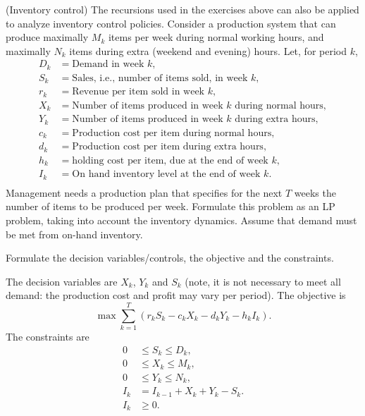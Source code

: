 \begin{exercise}(Inventory control) The recursions used in the
  exercises above can also be applied to analyze inventory control
  policies. Consider a production system that can produce maximally
  $M_k$ items per week during normal working hours, and maximally
  $N_k$ items during extra (weekend and evening) hours. Let, for
  period $k$,
  \begin{align*}
    D_k &= \text{Demand in  week $k$}, \\
    S_k &= \text{Sales, i.e., number of items sold, in week $k$}, \\
    r_k &= \text{Revenue per item sold in week $k$}, \\
    X_k &= \text{Number of items produced in week $k$  during normal hours}, \\
    Y_k &= \text{Number of items produced in week $k$ during extra  hours}, \\
    c_k &= \text{Production cost per item during normal  hours}, \\
    d_k &= \text{Production cost per item during extra  hours}, \\
    h_k &= \text{holding cost per  item, due at the end of week $k$}, \\
    I_k &= \text{On hand inventory level at the end of week $k$}. \\
  \end{align*}
  Management needs a production plan that specifies for the next $T$
  weeks the number of items to be produced per week. Formulate this
  problem as an LP problem, taking into account the inventory
  dynamics.  Assume that demand must be met from on-hand inventory.
  \begin{hint}
Formulate the decision variables/controls, the
    objective and the constraints.    
  \end{hint}
  \begin{solution}
    The decision variables are $X_k$, $Y_k$ and $S_k$ (note, it is not
    necessary to meet all demand:  the production cost and profit
    may vary per period).  The objective is 
    \begin{equation*}
      \max \sum_{k=1}^T (r_kS_k -c_k X_k - d_k Y_k - h_k I_k).
    \end{equation*}
The constraints are 
\begin{align*}
  0&\leq S_k \leq D_k, \\
  0&\leq X_k \leq M_k, \\
  0&\leq Y_k \leq N_k, \\
  I_k&=I_{k-1}+X_k+Y_k - S_k. \\
I_k &\geq 0.
\end{align*}
  \end{solution}
\end{exercise}

